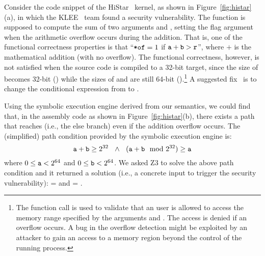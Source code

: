 

Consider the code snippet of the HiStar~\cite{HiStar:2006} kernel, as shown in Figure~\ref{fig:histar}(a), in which the KLEE~\cite{Cadar:2008} team found a security vulnerability.
The  function is supposed to compute the sum of two arguments  and , setting the flag argument  when the arithmetic overflow occurs during the addition.
That is, one of the functional correctness properties is that ``$\texttt{*of} = 1$ if $\texttt{a} + \texttt{b} > \texttt{r}$'', where $+$ is the mathematical addition (with no overflow).
The functional correctness, however, is not satisfied when the source code is compiled to a 32-bit target,
since the size of  becomes 32-bit () while the sizes of  and  are still 64-bit ().\footnote{The function call  is used to validate that an user is allowed to access the memory range specified by the arguments  and .
The access is denied if an overflow occurs.
A bug in the overflow detection might be exploited by an attacker to gain an access to a memory region beyond the control of the running process.}
A suggested fix~\cite{Cadar:2008} is to change the conditional expression from  to .

Using the symbolic execution engine derived from our semantics, we could find  that, in the assembly code as shown in Figure~\ref{fig:histar}(b), there exists a path that reaches  (i.e., the else branch) even if the addition overflow occurs.
The (simplified) path condition provided by the symbolic execution engine is:
\[
\texttt{a} + \texttt{b} \ge 2^{32}
~~\wedge~~
(\texttt{a} + \texttt{b} \mod 2^{32}) \ge \texttt{a}
\]
where $0 \le \texttt{a} < 2^{64}$ and $0 \le \texttt{b} < 2^{64}$.
We asked Z3 to solve the above path condition and it returned a solution (i.e., a concrete input to trigger the security vulnerability):  =  and   = .



